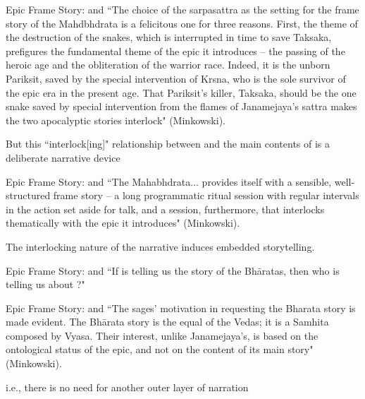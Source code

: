 \documentclass[aspectratio=169]{beamer}
\begin{document}
\begin{frame}{Epic Frame Story: \mah and \adi}
  ``The choice of the sarpasattra as the setting for the frame story of the Mahdbhdrata is a felicitous one for three reasons. 
  First, the theme of the destruction of the snakes, which is interrupted in time to save Taksaka, prefigures the fundamental theme of the epic it introduces
  -- the passing of the heroic age and the obliteration of the warrior race. 
  Indeed, it is the unborn Pariksit, saved by the special intervention of Krsna, who is the sole survivor of the epic era in the present age. 
  That Pariksit's killer, Taksaka, should be the one snake saved by special intervention from the flames of Janamejaya's sattra makes the two apocalyptic stories interlock" (Minkowski).

  \vspace{1em}
  But this ``interlock[ing]" relationship between \sarp and the main contents of \mah is a deliberate narrative device
\end{frame}

\begin{frame}{Epic Frame Story: \mah and \adi}
  ``The Mahabhdrata... provides itself with a sensible, well-structured frame story
  -- a long programmatic ritual session with regular intervals in the action set aside for talk, and a session, furthermore, that interlocks thematically with the epic it introduces" (Minkowski).

  \vspace{1em}
  The interlocking nature of the narrative induces embedded storytelling.
\end{frame}

\begin{frame}{Epic Frame Story: \mah and \adi} 
  ``If \vai is telling us the story of the Bh\={a}ratas, then who is telling us about \vai?"

  \vspace{1em}
\end{frame}

\begin{frame}{Epic Frame Story: \mah and \adi}
  ``The sages' motivation in requesting the Bharata story is made evident. 
  The Bh\={a}rata story is the equal of the Vedas; 
  it is a Samhita composed by Vyasa. 
  Their interest, unlike Janamejaya's, is based on the ontological status of the epic, and not on the content of its main story" (Minkowski). 

  \vspace{1em}
  i.e., there is no need for another outer layer of narration
\end{frame}
\end{document}
